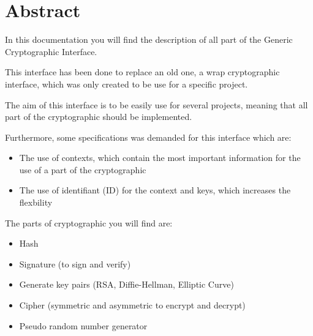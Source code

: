 \section*{Abstract}

In this documentation you will find the description of all part of the Generic
Cryptographic Interface.

This interface has been done to replace an old one, a wrap cryptographic
interface, which was only created to be use for a specific project.

The aim of this interface is to be easily use for several projects, meaning that
all part of the cryptographic should be implemented.

Furthermore, some specifications was demanded for this interface which are:
\begin{itemize}
 	\item 	The use of contexts, which contain the most important information for
  			the use of a part of the cryptographic
	\item 	The use of identifiant (ID) for the context and keys, which increases
			the flexbility
\end{itemize}

The parts of cryptographic you will find are:
\begin{itemize}
  	\item	Hash 
  	\item	Signature (to sign and verify)
  	\item 	Generate key pairs (RSA, Diffie-Hellman, Elliptic Curve)
  	\item	Cipher (symmetric and asymmetric to encrypt and decrypt)
  	\item 	Pseudo random number generator
\end{itemize}

